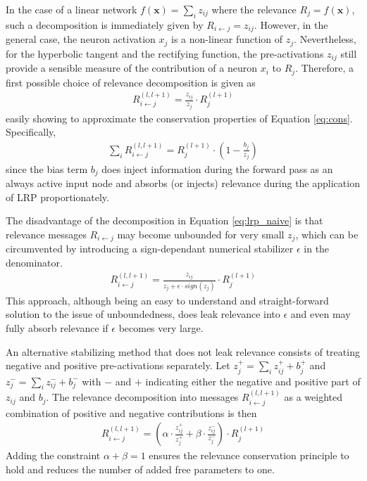 \documentclass[a4wide]{article}
\newcommand{\x}{\boldsymbol{x}}
\begin{document}
In the case of a linear network $f(\x) = \sum_i z_{ij}$  where the relevance $R_j = f(\x)$, such a decomposition is immediately given by $R_{i\leftarrow j} = z_{ij}$. However, in the general case, the neuron activation $x_j$ is a non-linear function of $z_j$. Nevertheless, for the hyperbolic tangent and the rectifying function, the pre-activations $z_{ij}$ still provide a sensible measure of the contribution  of a neuron $x_i$ to $R_j$. Therefore, a first possible choice of  relevance decomposition is given as
\begin{align}
R^{(l,l+1)}_{i\leftarrow j} = \frac{z_{ij}}{z_j}\cdot R_j^{(l+1)}
\label{eq:lrp_naive}
\end{align}
easily showing to approximate the conservation properties of Equation \ref{eq:cons}. Specifically, 
\begin{align}
\sum\limits_i R^{(l,l+1)}_{i\leftarrow j} = R_j^{(l+1)} \cdot (1 - \frac{b_j}{z_j})
\end{align}
since the bias term $b_j$ does inject information during the forward pass as an always active input node and absorbs (or injects) relevance during the application of LRP proportionately. 

The disadvantage of the decomposition in Equation \ref{eq:lrp_naive} is that relevance messages $R_{i\leftarrow j}$ may become unbounded for very small $z_j$, which can be circumvented by introducing a sign-dependant numerical stabilizer $\epsilon$ in the denominator.
\begin{align}
R^{(l,l+1)}_{i\leftarrow j} = \frac{z_{ij}}{z_j + \epsilon \cdot sign(z_j)}\cdot R_j^{(l+1)}
\label{eq:lrp_epsilon}
\end{align}
This approach, although being an easy to understand and straight-forward solution to the issue of unboundedness, does leak relevance into $\epsilon$ and even may fully absorb relevance if $\epsilon$ becomes very large.



An alternative stabilizing method that does not leak relevance consists of treating negative and positive  pre-activations separately. Let $z_j^+ = \sum_i z^+_{ij} + b^+_j$ and $z_j^- = \sum_i z^-_{ij} + b^-_j$ with $-$ and $+$ indicating either the negative and positive part of $z_{ij}$ and $b_j$. The relevance decomposition into messages $R_{i \leftarrow j}^{(l,l+1)}$ as a weighted combination of positive and negative contributions is then
\begin{align}
R^{(l,l+1)}_{i\leftarrow j} = \left(\alpha\cdot\frac{z_{ij}^+}{z_j^+} + \beta\cdot\frac{z_{ij}^-}{z_j^-}\right)\cdot R_j^{(l+1)}
\label{eq:lrp_alphabeta}
\end{align}
Adding the constraint $\alpha + \beta = 1$ ensures the relevance conservation principle to hold and reduces the number of added free parameters to one.
\end{document}
